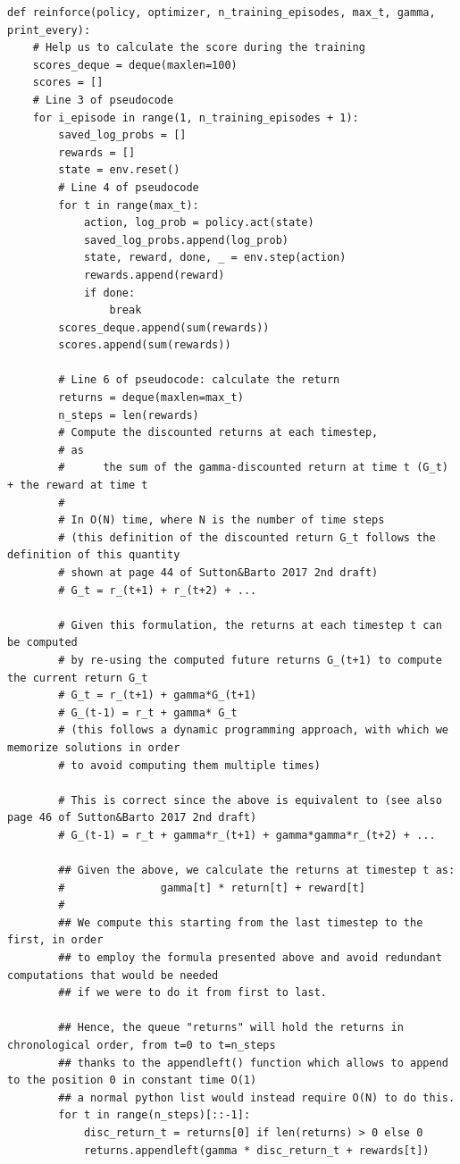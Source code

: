 \documentclass[11pt,a4paper]{article}
\begin{document}
\begin{lstlisting}
def reinforce(policy, optimizer, n_training_episodes, max_t, gamma, print_every):
    # Help us to calculate the score during the training
    scores_deque = deque(maxlen=100)
    scores = []
    # Line 3 of pseudocode
    for i_episode in range(1, n_training_episodes + 1):
        saved_log_probs = []
        rewards = []
        state = env.reset()
        # Line 4 of pseudocode
        for t in range(max_t):
            action, log_prob = policy.act(state)
            saved_log_probs.append(log_prob)
            state, reward, done, _ = env.step(action)
            rewards.append(reward)
            if done:
                break
        scores_deque.append(sum(rewards))
        scores.append(sum(rewards))

        # Line 6 of pseudocode: calculate the return
        returns = deque(maxlen=max_t)
        n_steps = len(rewards)
        # Compute the discounted returns at each timestep,
        # as
        #      the sum of the gamma-discounted return at time t (G_t) + the reward at time t
        #
        # In O(N) time, where N is the number of time steps
        # (this definition of the discounted return G_t follows the definition of this quantity
        # shown at page 44 of Sutton&Barto 2017 2nd draft)
        # G_t = r_(t+1) + r_(t+2) + ...

        # Given this formulation, the returns at each timestep t can be computed
        # by re-using the computed future returns G_(t+1) to compute the current return G_t
        # G_t = r_(t+1) + gamma*G_(t+1)
        # G_(t-1) = r_t + gamma* G_t
        # (this follows a dynamic programming approach, with which we memorize solutions in order
        # to avoid computing them multiple times)

        # This is correct since the above is equivalent to (see also page 46 of Sutton&Barto 2017 2nd draft)
        # G_(t-1) = r_t + gamma*r_(t+1) + gamma*gamma*r_(t+2) + ...

        ## Given the above, we calculate the returns at timestep t as:
        #               gamma[t] * return[t] + reward[t]
        #
        ## We compute this starting from the last timestep to the first, in order
        ## to employ the formula presented above and avoid redundant computations that would be needed
        ## if we were to do it from first to last.

        ## Hence, the queue "returns" will hold the returns in chronological order, from t=0 to t=n_steps
        ## thanks to the appendleft() function which allows to append to the position 0 in constant time O(1)
        ## a normal python list would instead require O(N) to do this.
        for t in range(n_steps)[::-1]:
            disc_return_t = returns[0] if len(returns) > 0 else 0
            returns.appendleft(gamma * disc_return_t + rewards[t])


\end{lstlisting}
\end{document}
